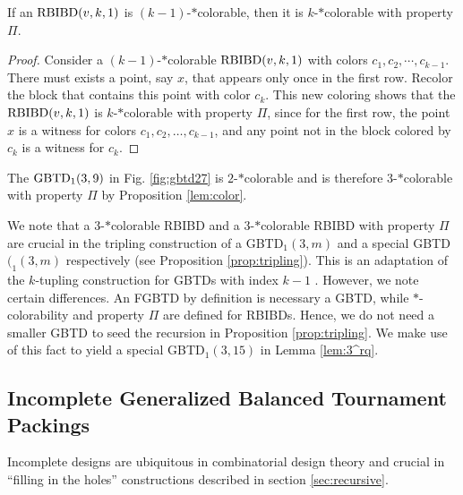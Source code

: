 \documentclass[draft, 11pt]{article}
\begin{document}
\begin{proposition}
\label{lem:color} If an ${\rm RBIBD}(v,k,1)$ is
$(k-1)$-$*$colorable, then it is $k$-$*$colorable with property
$\Pi$.
\end{proposition}

 \begin{proof}
 Consider a $(k-1)$-$*$colorable $\textrm{RBIBD}(v,k,1)$ with colors
 $c_1,c_2,\cdots,c_{k-1}$. There must exists a point, say $x$, that
 appears only once in the first row. Recolor the block that contains
 this point with color $c_k$. This new coloring shows that the
 $\textrm{RBIBD}(v,k,1)$ is $k$-$*$colorable with property $\Pi$, 
since for the first row, the point $x$ is a witness for colors $c_1,c_2,\ldots,c_{k-1}$,
and any point not in the block colored by $c_k$ is a witness for $c_k$.
 \end{proof}
                                                      

\begin{example}
The ${\rm GBTD}_1(3,9)$ in Fig. \ref{fig:gbtd27} is
$2$-$*$colorable and is therefore $3$-$*$colorable
with property $\Pi$ by Proposition \ref{lem:color}.
\end{example}

We note that a $3$-$*$colorable RBIBD and a $3$-$*$colorable RBIBD with property $\Pi$ 
are crucial in the tripling construction of a GBTD$_1(3,m)$ and a special GBTD$(_1(3,m)$  respectively
(see Proposition \ref{prop:tripling}). 
This is an adaptation of the $k$-tupling construction for GBTDs with index $k-1$ \cite[Theorem 3.1]{Lamken:1994}. 
However, we note certain differences. An FGBTD by definition is necessary a GBTD,
while $*$-colorability and property $\Pi$ are defined for RBIBDs.
Hence, we do not need a smaller GBTD to seed the recursion in Proposition \ref{prop:tripling}.
We make use of this fact to yield a special GBTD$_1(3,15)$ in Lemma \ref{lem:3^rq}.


 \subsection{Incomplete Generalized Balanced Tournament Packings}
 \label{sec:igbtp}

Incomplete designs are ubiquitous in combinatorial design theory and 
crucial in ``filling in the holes'' constructions described in section \ref{sec:recursive}.
\end{document}
